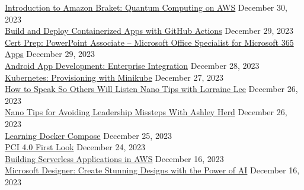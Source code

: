 \documentclass[10pt]{res} %
\begin{document}
\begin{resume}
\href{https://www.linkedin.com/learning/certificates/49fed9b8550e8c91b0cdbae1d6589ed99e119195afd47a88c888e2db2ba089c2}{\color{blue}Introduction to Amazon Braket: Quantum Computing on AWS} \hfill December 30, 2023 \\
\href{https://www.linkedin.com/learning/certificates/da4ec0cf4904e029e69200e0895bf44f5511d45ec4186e8365719f88592a3317}{\color{blue}Build and Deploy Containerized Apps with GitHub Actions} \hfill December 29, 2023 \\
\href{https://www.linkedin.com/learning/certificates/25e003d38a967a756a30bddf75e445e1a9362cf1f6a983795b545d82d0787d3a}{\color{blue}Cert Prep: PowerPoint Associate -- Microsoft Office Specialist for Microsoft 365 Apps} \hfill December 29, 2023 \\
\href{https://www.linkedin.com/learning/certificates/95094102ec43ba9f9d2b2f0b22859862de36a0f4b8ccddea33b1a5ea19ac8e87}{\color{blue}Android App Development: Enterprise Integration} \hfill December 28, 2023 \\
\href{https://www.linkedin.com/learning/certificates/18f11eaff737a8ac2de98e0ce121828d78302aa07531b3828703621b03b2d993}{\color{blue}Kubernetes: Provisioning with Minikube} \hfill December 27, 2023 \\
\href{https://www.linkedin.com/learning/certificates/86fa439ebc0c1802975228eaad93a8499a1c8cd1d9dff73e95f05652f87b3dfe}{\color{blue}How to Speak So Others Will Listen Nano Tips with Lorraine Lee} \hfill December 26, 2023 \\
\href{https://www.linkedin.com/learning/certificates/b02f5e66bb9ac63c2f27b3ef341904b099ea6d42edfd4a5afe942a6c124a8401}{\color{blue}Nano Tips for Avoiding Leadership Missteps With Ashley Herd} \hfill December 26, 2023 \\
\href{https://www.linkedin.com/learning/certificates/bf9469d0dce361e94121b825de0150d6e44b633234eca5de08e752fbebde8bca}{\color{blue}Learning Docker Compose} \hfill December 25, 2023 \\
\href{https://www.linkedin.com/learning/certificates/506d834e9414360fd9033c1e28d1ce2f83963ff72bb0b9875ae0e1df798d81fa}{\color{blue}PCI 4.0 First Look} \hfill December 24, 2023 \\
\href{https://www.linkedin.com/learning/certificates/c2fc0aefb9c1e091e12cc5d1274fb6201be89887b5862788f5fc989ffe78a3cd}{\color{blue}Building Serverless Applications in AWS} \hfill December 16, 2023 \\
\href{https://www.linkedin.com/learning/certificates/bbebab439cbbe6eeea7bb462c5926fa989647f2a16b5036305f430fccdc3fd6a}{\color{blue}Microsoft Designer: Create Stunning Designs with the Power of AI} \hfill December 16, 2023 \\

\end{resume}
\end{document}
